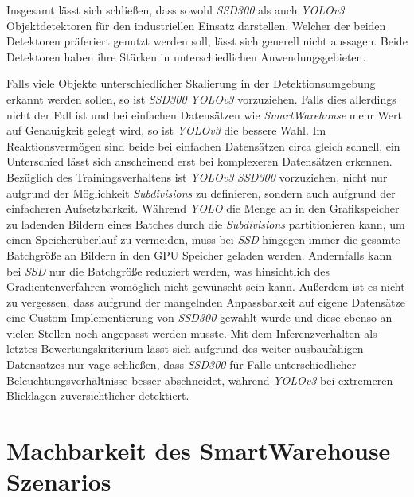 Insgesamt lässt sich schließen, dass sowohl \textit{SSD300} als auch \textit{YOLOv3} Objektdetektoren für den industriellen Einsatz darstellen. Welcher der beiden Detektoren präferiert genutzt werden soll, lässt sich generell nicht aussagen. Beide Detektoren haben ihre Stärken in unterschiedlichen Anwendungsgebieten. 

Falls viele Objekte unterschiedlicher Skalierung in der Detektionsumgebung erkannt werden sollen, so ist \textit{SSD300} \textit{YOLOv3} vorzuziehen. Falls dies allerdings nicht der Fall ist und bei einfachen Datensätzen wie \textit{SmartWarehouse} mehr Wert auf Genauigkeit gelegt wird, so ist \textit{YOLOv3} die bessere Wahl. Im Reaktionsvermögen sind beide bei einfachen Datensätzen circa gleich schnell, ein Unterschied lässt sich anscheinend erst bei komplexeren Datensätzen erkennen. Bezüglich des Trainingsverhaltens ist \textit{YOLOv3} \textit{SSD300} vorzuziehen, nicht nur aufgrund der Möglichkeit \textit{Subdivisions} zu definieren, sondern auch aufgrund der einfacheren Aufsetzbarkeit. Während \textit{YOLO} die Menge an in den Grafikspeicher zu ladenden Bildern eines Batches durch die \textit{Subdivisions} partitionieren kann, um einen Speicherüberlauf zu vermeiden, muss bei \textit{SSD} hingegen immer die gesamte Batchgröße an Bildern in den GPU Speicher geladen werden. Andernfalls kann bei \textit{SSD} nur die Batchgröße reduziert werden, was hinsichtlich des Gradientenverfahren womöglich nicht gewünscht sein kann. Außerdem ist es nicht zu vergessen, dass aufgrund der mangelnden Anpassbarkeit auf eigene Datensätze eine Custom-Implementierung von \textit{SSD300} gewählt wurde und diese ebenso an vielen Stellen noch angepasst werden musste. Mit dem Inferenzverhalten als letztes Bewertungskriterium lässt sich aufgrund des weiter ausbaufähigen Datensatzes nur vage schließen, dass \textit{SSD300} für Fälle unterschiedlicher Beleuchtungsverhältnisse besser abschneidet, während \textit{YOLOv3} bei extremeren Blicklagen zuversichtlicher detektiert. 

\section{Machbarkeit des SmartWarehouse Szenarios}

